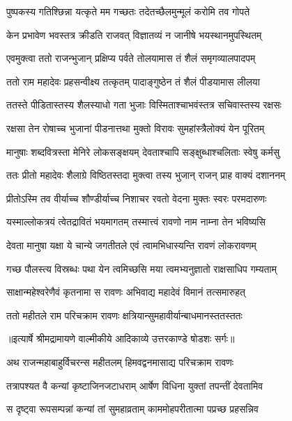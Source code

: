 \twolineshloka
{पुष्पकस्य गतिश्छिन्ना यत्कृते मम गच्छतः}
{तदेतच्छैलमुन्मूलं करोमि तव गोपते} %

\twolineshloka
{केन प्रभावेण भवस्तत्र क्रीडति राजवत्}
{विज्ञातव्यं न जानीषे भयस्थानमुपस्थितम्} %

\twolineshloka
{एवमुक्त्वा ततो राजन्भुजान् प्रक्षिप्य पर्वते}
{तोलयामास तं शैलं समृगव्यालपादपम्} %

\twolineshloka
{ततो राम महादेवः प्रहसन्वीक्ष्य तत्कृतम्}
{पादाङ्गुष्ठेन तं शैलं पीडयामास लीलया} %

\twolineshloka
{ततस्ते पीडितास्तस्य शैलस्याधो गता भुजाः}
{विस्मिताश्चाभवंस्तत्र सचिवास्तस्य रक्षसः} %

\twolineshloka
{रक्षसा तेन रोषाच्च भुजानां पीडनात्तथा}
{मुक्तो विरावः सुमहांस्त्रैलोक्यं येन पूरितम्} %

\twolineshloka
{मानुषाः शब्दवित्रस्ता मेनिरे लोकसङ्क्षयम्}
{देवताश्चापि सङ्क्षुब्धाश्चलिताः स्वेषु कर्मसु} %

\twolineshloka
{ततः प्रीतो महादेवः शैलाग्रे विष्ठितस्तदा}
{मुक्त्वा तस्य भुजान् राजन् प्राह वाक्यं दशाननम्} %

\twolineshloka
{प्रीतोऽस्मि तव वीर्याच्च शौण्डीर्याच्च निशाचर}
{रवतो वेदना मुक्तः स्वरः परमदारुणः} %

\twolineshloka
{यस्माल्लोकत्रयं त्वेतद्रावितं भयमागतम्}
{तस्मात्त्वं रावणो नाम नाम्ना तेन भविष्यसि} %

\twolineshloka
{देवता मानुषा यक्षा ये चान्ये जगतीतले}
{एवं त्वामभिधास्यन्ति रावणं लोकरावणम्} %

\twolineshloka
{गच्छ पौलस्त्य विस्रब्धः पथा येन त्वमिच्छसि}
{मया त्वमभ्यनुज्ञातो राक्षसाधिप गम्यताम्} %

\twolineshloka
{साक्षान्महेश्वरेणैवं कृतनामा स रावणः}
{अभिवाद्य महादेवं विमानं तत्समारुहत्} %

\twolineshloka
{ततो महीतले राम परिचक्राम रावणः}
{क्षत्रियान्सुमहावीर्यान्बाधमानस्ततस्ततः} %


{॥इत्यार्षे श्रीमद्रामायणे वाल्मीकीये आदिकाव्ये उत्तरकाण्डे षोडशः सर्गः॥}


\twolineshloka
{अथ राजन्महाबाहुर्विचरन्स महीतलम्}
{हिमवद्वनमासाद्य परिचक्राम रावणः} %

\twolineshloka
{तत्रापश्यत वै कन्यां कृष्टाजिनजटाधराम्}
{आर्षेण विधिना युक्तां तपन्तीं देवतामिव} %

\twolineshloka
{स दृष्ट्वा रूपसम्पन्नां कन्यां तां सुमहाव्रताम्}
{काममोहपरीतात्मा पप्रच्छ प्रहसन्निव} %

